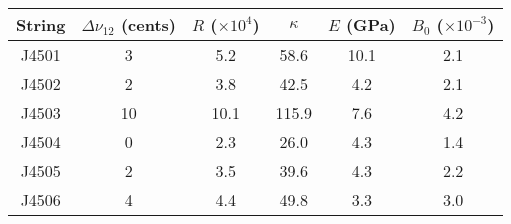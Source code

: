 \begin{tabular}{cccccc}
\toprule
String &  $\Delta \nu_{12}$ (cents) &  $R$ ($\times 10^4$) &  $\kappa$ &  $E$ (GPa) &  $B_0$ ($\times 10^{-3}$) \\
\midrule
 J4501 &                          3 &                  5.2 &      58.6 &       10.1 &                       2.1 \\
 J4502 &                          2 &                  3.8 &      42.5 &        4.2 &                       2.1 \\
 J4503 &                         10 &                 10.1 &     115.9 &        7.6 &                       4.2 \\
 J4504 &                          0 &                  2.3 &      26.0 &        4.3 &                       1.4 \\
 J4505 &                          2 &                  3.5 &      39.6 &        4.3 &                       2.2 \\
 J4506 &                          4 &                  4.4 &      49.8 &        3.3 &                       3.0 \\
\bottomrule
\end{tabular}

